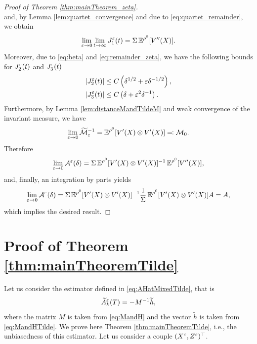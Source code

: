 \documentclass[10pt]{article}
\begin{document}
\begin{appendices}
\begin{proof}[Proof of Theorem \ref{thm:mainTheorem_zeta}]
\begin{equation}
	\end{equation}
	and, by Lemma \ref{lem:quartet_convergence} and due to \eqref{eq:quartet_remainder}, we obtain
	\begin{equation}
	\lim_{\varepsilon \to 0} \lim_{t \to \infty} J_1^\varepsilon(t) = \Sigma \operatorname{\mathbb{E}}^{\rho^0} [V''(X)].
	\end{equation}
	Moreover, due to \eqref{eq:beta} and \eqref{eq:remainder_zeta}, we have the following bounds for $J_2^\varepsilon(t)$ and $J_3^\varepsilon(t)$
	\begin{equation}
	\begin{aligned}
		\left\lvert J_2^\varepsilon(t)\right\rvert &\le C \left( \delta^{1/2} + \varepsilon \delta^{-1/2} \right), \\
		\left\lvert J_3^\varepsilon(t)\right\rvert &\le C \left( \delta + \varepsilon^2 \delta^{-1} \right).
	\end{aligned}
	\end{equation}
	Furthermore, by Lemma \ref{lem:distanceMandTildeM} and weak convergence of the invariant measure, we have
	\begin{equation}
		\lim_{\varepsilon \to 0} \widetilde{\mathcal M}_\varepsilon^{-1} = \operatorname{\mathbb{E}}^{\rho^0} [V'(X) \otimes V'(X) ] \eqqcolon \mathcal M_0.
	\end{equation}
	Therefore
	\begin{equation}
		\lim_{\varepsilon \to 0} \mathcal A^\varepsilon(\delta) = \Sigma \operatorname{\mathbb{E}}^{\rho^0} [V'(X) \otimes V'(X) ]^{-1} \operatorname{\mathbb{E}}^{\rho^0} [V''(X)],
	\end{equation}
	and, finally, an integration by parts yields
	\begin{equation}
		\lim_{\varepsilon \to 0} \mathcal A^\varepsilon(\delta) = \Sigma \operatorname{\mathbb{E}}^{\rho^0} [V'(X) \otimes V'(X) ]^{-1} \frac1\Sigma \operatorname{\mathbb{E}}^{\rho^0} [V'(X) \otimes V'(X) ] A = A,
	\end{equation}
	which implies the desired result.
\end{proof}


\section{Proof of Theorem \ref{thm:mainTheoremTilde}}\label{ap:EstimatorTilde}
Let us consider the estimator defined in \eqref{eq:AHatMixedTilde}, that is
\begin{equation}
	\widetilde A^\varepsilon_k(T) = -M^{-1}\widetilde h,
\end{equation}
where the matrix $M$ is taken from \eqref{eq:MandH} and the vector $\widetilde{h}$ is taken from \eqref{eq:MandHTilde}. We prove here Theorem \ref{thm:mainTheoremTilde}, i.e., the unbiasedness of this estimator. Let us consider a couple $(X^\varepsilon, Z^\varepsilon)^\top$. 


\end{appendices}
\end{document}
